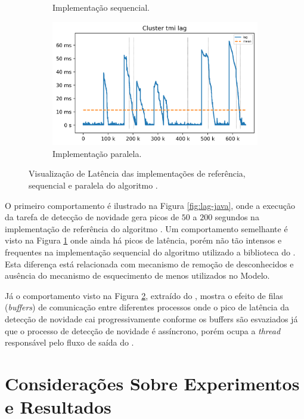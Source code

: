 \begin{figure}[ht]
\begin{subfigure}{0.48\textwidth}
    \caption{Implementação sequencial.}
    \label{fig:lag-serial}
  \end{subfigure}
  \begin{subfigure}{0.48\textwidth}
    \centering
    \includegraphics[width=1\linewidth]{experiments/lag-mfog.png}
    \caption{Implementação paralela.}
    \label{fig:lag-mfog}
  \end{subfigure}
  \caption{Visualização de Latência das implementações de referência, sequencial
  e paralela do algoritmo \minas.}
  \label{fig:lag}
\end{figure}

O primeiro comportamento é ilustrado na Figura \ref{fig:lag-java}, onde a execução
da tarefa de detecção de novidade gera picos de $50$ a $200$ segundos
na implementação de referência do algoritmo \minas.
Um comportamento semelhante é visto na Figura \ref{fig:lag-serial} onde ainda há
picos de latência, porém não tão intensos e frequentes na implementação sequencial
do algoritmo \minas utilizado a biblioteca do \mfog.
Esta diferença está relacionada com mecanismo de remoção de desconhecidos e
ausência do mecanismo de esquecimento de \mclusters menos utilizados no Modelo.

Já o comportamento visto na Figura \ref{fig:lag-mfog}, extraído do \mfog, mostra o efeito de
filas (\emph{buffers}) de comunicação entre diferentes processos onde o pico de latência
da detecção de novidade cai progressivamente conforme os buffers são esvaziados
já que o processo de detecção de novidade é assíncrono, porém ocupa a \emph{thread}
responsável pelo fluxo de saída do \mfog.

\section{Considerações Sobre Experimentos e Resultados}
\label{sec:exp-conclusao}

